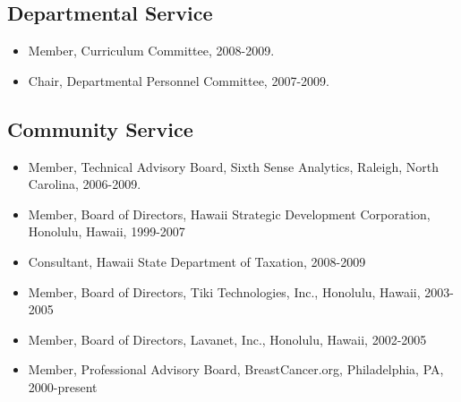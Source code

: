 \documentclass[11pt]{article}
\begin{document}
\subsection{Departmental Service}

\begin{itemize}
\item Member, Curriculum Committee, 2008-2009.
\item Chair, Departmental Personnel Committee, 2007-2009.
\end{itemize}


\subsection{Community Service}

\begin{itemize}

\item Member, Technical Advisory Board, Sixth Sense Analytics, Raleigh, North Carolina, 2006-2009.

\item Member, Board of Directors, Hawaii Strategic Development Corporation, Honolulu, Hawaii,  1999-2007 

\item Consultant, Hawaii State Department of Taxation,  2008-2009

\item Member, Board of Directors, Tiki Technologies, Inc., Honolulu, Hawaii,  2003-2005 

\item Member, Board of Directors, Lavanet, Inc., Honolulu,   Hawaii, 2002-2005 

\item Member, Professional Advisory Board, BreastCancer.org, Philadelphia, PA,  2000-present 

\end{itemize}
\end{document}
